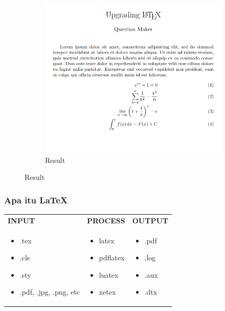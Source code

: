 \documentclass[aspectratio=169,10pt]{beamer}
\begin{document}
\begin{frame}
\begin{figure}
\begin{subfigure}[t!]{0.3\linewidth}
        \end{subfigure}
        \begin{subfigure}[t!]{0.3\linewidth}
            \captionsetup{labelformat=empty}
            \caption{\huge{Result}}
            \includegraphics[width=\linewidth]{resultLatex.png}
        \end{subfigure}
    \end{figure}
\end{frame}

\begin{frame}
    \frametitle{Apa itu \LaTeX}
    \begin{tabularx}{\textwidth}{X X X}
        \textbf{INPUT} & \textbf{PROCESS} & \textbf{OUTPUT} \\
          \begin{itemize}
            \item .tex
            \item .cls
            \item .sty
            \item .pdf, .jpg, .png, etc
          \end{itemize}&
          \begin{itemize}
            \item latex
            \item pdflatex
            \item luatex
            \item xetex
          \end{itemize}&
          \begin{itemize}
            \item .pdf
            \item .log
            \item .aux
            \item .dtx
          \end{itemize}
          \end{tabularx}
\end{frame}
    
\end{document}
